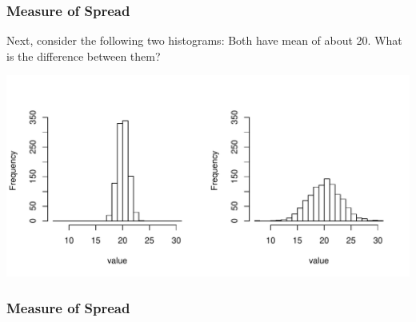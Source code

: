 \documentclass[handout]{beamer}
\newcommand{\blue}[1]{\textcolor{blue2}{#1}}
\begin{document}
\begin{frame}[fragile]
\frametitle{Measure of Spread}

Next, consider the following two histograms:  Both have mean of about 20.  What is the difference between them?

\begin{center}
\pause \includegraphics[width=\textwidth]{figure/spread.pdf}
\end{center}

\end{frame}


\begin{frame}[fragile]
\frametitle{Measure of Spread}

%
%
%
%

\end{frame}
\end{document}
